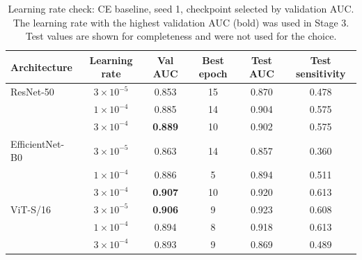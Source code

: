 \begin{table}[h]
\centering
\small
\caption{Learning rate check: CE baseline, seed 1, checkpoint selected by validation AUC. The learning rate with the highest validation AUC (bold) was used in Stage 3. Test values are shown for completeness and were not used for the choice.}
\label{tab:supplr}
\begin{tabular}{lccccc}
\toprule
Architecture & Learning rate & Val AUC & Best epoch & Test AUC & Test sensitivity \\
\midrule
ResNet-50 & $3\times10^{-5}$ & 0.853 & 15 & 0.870 & 0.478 \\
 & $1\times10^{-4}$ & 0.885 & 14 & 0.904 & 0.575 \\
 & $3\times10^{-4}$ & \textbf{0.889} & 10 & 0.902 & 0.575 \\
\midrule
EfficientNet-B0 & $3\times10^{-5}$ & 0.863 & 14 & 0.857 & 0.360 \\
 & $1\times10^{-4}$ & 0.886 & 5 & 0.894 & 0.511 \\
 & $3\times10^{-4}$ & \textbf{0.907} & 10 & 0.920 & 0.613 \\
\midrule
ViT-S/16 & $3\times10^{-5}$ & \textbf{0.906} & 9 & 0.923 & 0.608 \\
 & $1\times10^{-4}$ & 0.894 & 8 & 0.918 & 0.613 \\
 & $3\times10^{-4}$ & 0.893 & 9 & 0.869 & 0.489 \\
\bottomrule
\end{tabular}
\end{table}
